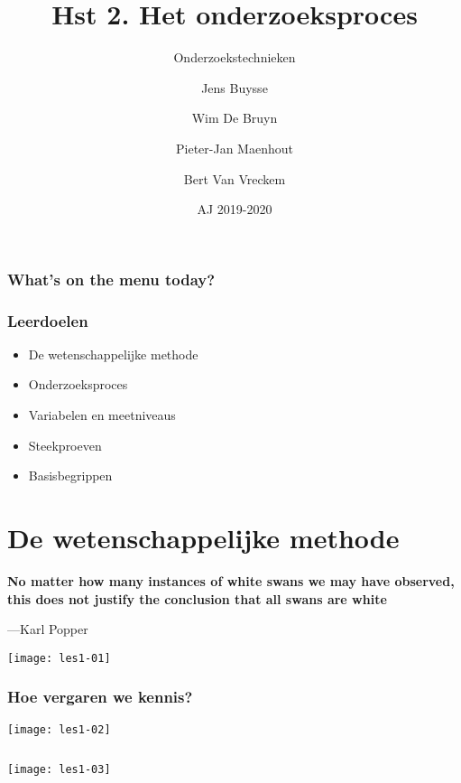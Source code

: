 \documentclass[aspectratio=169]{beamer}
\title{Hst 2. Het onderzoeksproces}
\subtitle{Onderzoekstechnieken}
\author{Jens Buysse \and Wim {De Bruyn} \and Pieter-Jan Maenhout \and Bert {Van Vreckem}}
\date{AJ 2019-2020}
\begin{document}
\begin{frame}
  \maketitle
\end{frame}

\begin{frame}
  \frametitle{What's on the menu today?}
  
  \tableofcontents
\end{frame}

\begin{frame}
  \frametitle{Leerdoelen}
  
  \begin{itemize}
    \item De wetenschappelijke methode
    \item Onderzoeksproces
    \item Variabelen en meetniveaus
    \item Steekproeven
    \item Basisbegrippen
  \end{itemize}
\end{frame}

\section{De wetenschappelijke methode}


\begin{frame}[plain]
  \bfseries\Large
  No matter how many instances of white swans we may have observed, this does not justify the conclusion that all swans are white
  
  \bigskip
  
  ---Karl Popper
\end{frame}

\begin{frame}[plain]
  \centering
  \texttt{[image: les1-01]}
\end{frame}

\begin{frame}
  \frametitle{Hoe vergaren we kennis?}
  
  \centering
  \texttt{[image: les1-02]}
\end{frame}

\begin{frame}[plain,c]
  \begin{columns}
    \column{\dimexpr\paperwidth}
    \texttt{[image: les1-03]}
  \end{columns}
\end{frame}
\end{document}
